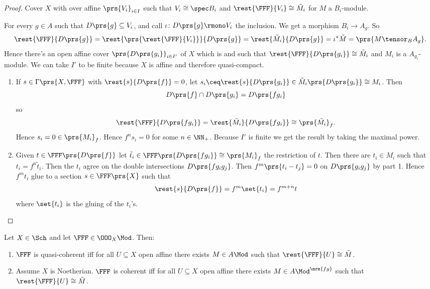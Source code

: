 \documentclass[10pt,a4paper,twoside,openany,hidelinks]{book}
\begin{document}
\begin{proof}
Cover $X$ with over affine $\prs{V_i}_{i \in I}$ such that $V_i \cong \spec B_i$ and $\rest{\FFF}{V_i} \cong \tilde{M}_i$ for $M$ a $B_i$-module.

For every $g \in A$ such that $D\prs{g} \subseteq V_i$, and call $\iota \colon D\prs{g} \rmono V_i$ the inclusion. We get a morphism $B_i \to A_g$.
So \[\rest{\FFF}{D\prs{g}} = \rest{\prs{\rest{\FFF}{V_i}}}{{D\prs{g}}} = \rest{\tilde{M_i}}{D\prs{g}} = \iota^*\tilde{M} = \prs{M \tensor_B A_g} \text{.}\]
Hence there's an open affine cover $\prs{D\prs{g_i}}_{i \in I'}$ of $X$ which is and such that $\rest{\FFF}{D\prs{g_i}} \cong \tilde{M}_i$ and $M_i$ is a $A_{g_i}$-module. We can take $I'$ to be finite because $X$ is affine and therefore quasi-compact.

\begin{enumerate}
\item If $s \in \Gamma\prs{X,\FFF}$ with $\rest{s}{D\prs{f}} = 0$, let $s_i \ceq \rest{s}{D\prs{g_i}} \in \tilde{M}_i \prs{D\prs{g_i}} \cong M_i$.
Then
\[D\prs{f} \cap D\prs{g_i} = D\prs{f g_i}\]
so
\[\rest{\FFF}{D\prs{f g_i}} = \rest{\tilde{M}_i}{D\prs{f g_i}} \cong \prs{\tilde{M}_i}_f \text{.}\]
Hence $s_i = 0 \in \prs{M_i}_f$. Hence $f^n s_i = 0$ for some $n \in \NN_+$. Because $I'$ is finite we get the result by taking the maximal power.

\item Given $t \in \FFF\prs{D\prs{f}}$ let $\tilde{t}_i \in \FFF\prs{D\prs{f g_i}} \cong \prs{M_i}_f$ the restriction of $t$.
Then there are $t_i \in M_i$ such that $t_i = f^n \tilde{t}_i$. Then the $t_i$ agree on the double intersections $D\prs{f g_i g_j}$.
Then $f^m \prs{t_i - t_j} = 0$ on $D\prs{g_i g_j}$ by part 1.
Hence $f^m t_i$ glue to a section $s \in \FFF\prs{X}$ such that \[\rest{s}{D\prs{f}} = f^m \set{t_i} = f^{m+n} t\]
where $\set{t_i}$ is the gluing of the $t_i$'s.
\end{enumerate}
\end{proof}


\begin{proposition}
Let $X \in \Sch$ and let $\FFF \in \OOO_X\Mod$. Then:
\begin{enumerate}
\item $\FFF$ is quasi-coherent iff for all $U \subseteq X$ open affine there exists $M \in A\Mod$ such that $\rest{\FFF}{U} \cong \tilde{M}$.
\item Assume $X$ is Noetherian. $\FFF$ is coherent iff for all $U \subseteq X$ open affine there exists $M \in A\Mod^{\mrm{fg}}$ such that $\rest{\FFF}{U} \cong \tilde{M}$.
\end{enumerate}
\end{proposition}
\end{document}
